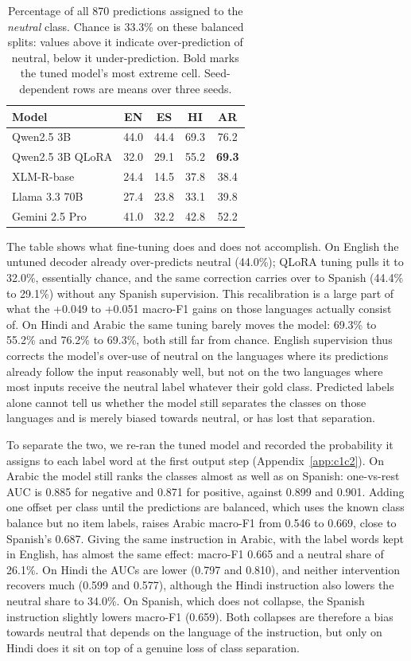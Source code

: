 \documentclass[11pt]{article}
\begin{document}
\begin{table}[t]
\centering\small
\setlength{\tabcolsep}{4pt}
\begin{tabular}{@{}lcccc@{}}
\toprule
Model & EN & ES & HI & AR \\
\midrule
Qwen2.5 3B         & 44.0 & 44.4 & 69.3 & 76.2 \\
Qwen2.5 3B QLoRA   & 32.0 & 29.1 & 55.2 & \textbf{69.3} \\
\mbox{XLM-R}-base         & 24.4 & 14.5 & 37.8 & 38.4 \\
Llama 3.3 70B      & 27.4 & 23.8 & 33.1 & 39.8 \\
Gemini 2.5 Pro     & 41.0 & 32.2 & 42.8 & 52.2 \\
\bottomrule
\end{tabular}
\caption{Percentage of all 870 predictions assigned to the \emph{neutral} class.
Chance is 33.3\% on these balanced splits: values above it indicate
over-prediction of neutral, below it under-prediction. Bold marks the tuned
model's most extreme cell. Seed-dependent rows are means over three seeds.}
\label{tab:neutral}
\end{table}

The table shows what fine-tuning does and does not accomplish. On English the
untuned decoder already over-predicts neutral (44.0\%); QLoRA tuning pulls it to
32.0\%, essentially chance, and the same correction carries over to Spanish
(44.4\% to 29.1\%) without any Spanish supervision. This recalibration is a large
part of what the +0.049 to +0.051 macro-F1 gains on those languages actually
consist of. On Hindi and Arabic the same tuning barely moves the model: 69.3\% to
55.2\% and 76.2\% to 69.3\%, both still far from chance. English supervision thus
corrects the model's over-use of neutral on the languages where its predictions
already follow the input reasonably well, but not on the two languages where most
inputs receive the neutral label whatever their gold class. Predicted labels alone
cannot tell us whether the model still separates the classes on those languages and
is merely biased towards neutral, or has lost that separation.

To separate the two, we re-ran the tuned model and recorded the probability it
assigns to each label word at the first output step (Appendix~\ref{app:c1c2}). On
Arabic the model still ranks the classes almost as well as on Spanish: one-vs-rest
AUC is 0.885 for negative and 0.871 for positive, against 0.899 and 0.901. Adding
one offset per class until the predictions are balanced, which uses the known class
balance but no item labels, raises Arabic macro-F1 from 0.546 to 0.669, close to
Spanish's 0.687. Giving the same instruction in Arabic, with the label words kept in
English, has almost the same effect: macro-F1 0.665 and a neutral share of 26.1\%.
On Hindi the AUCs are lower (0.797 and 0.810), and neither intervention recovers
much (0.599 and 0.577), although the Hindi instruction also lowers the neutral share
to 34.0\%. On Spanish, which does not collapse, the Spanish instruction slightly
lowers macro-F1 (0.659). Both collapses are therefore a bias towards neutral that
depends on the language of the instruction, but only on Hindi does it sit on top of
a genuine loss of class separation.
\end{document}
